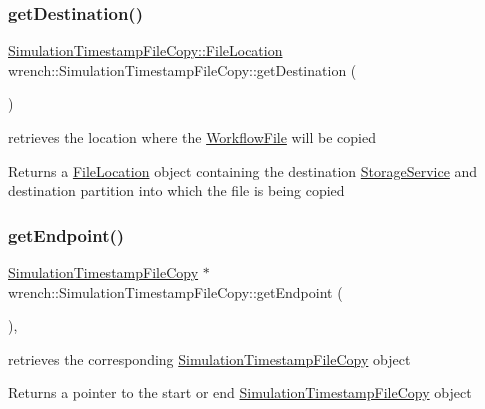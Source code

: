 \subsubsection{\texorpdfstring{get\+Destination()}{getDestination()}}
{\footnotesize\ttfamily \hyperlink{structwrench_1_1_simulation_timestamp_file_copy_1_1_file_location}{Simulation\+Timestamp\+File\+Copy\+::\+File\+Location} wrench\+::\+Simulation\+Timestamp\+File\+Copy\+::get\+Destination (\begin{DoxyParamCaption}{ }\end{DoxyParamCaption})}



retrieves the location where the \hyperlink{classwrench_1_1_workflow_file}{Workflow\+File} will be copied 

\begin{DoxyReturn}{Returns}
a \hyperlink{structwrench_1_1_simulation_timestamp_file_copy_1_1_file_location}{File\+Location} object containing the destination \hyperlink{classwrench_1_1_storage_service}{Storage\+Service} and destination partition into which the file is being copied 
\end{DoxyReturn}
\mbox{\label{classwrench_1_1_simulation_timestamp_file_copy_a2cd940b53a294459ebcab5bce823c9a0}} 
\subsubsection{\texorpdfstring{get\+Endpoint()}{getEndpoint()}}
{\footnotesize\ttfamily \hyperlink{classwrench_1_1_simulation_timestamp_file_copy}{Simulation\+Timestamp\+File\+Copy} $\ast$ wrench\+::\+Simulation\+Timestamp\+File\+Copy\+::get\+Endpoint (\begin{DoxyParamCaption}{ }\end{DoxyParamCaption})\hspace{0.3cm}{\ttfamily [override]}, {\ttfamily [virtual]}}



retrieves the corresponding \hyperlink{classwrench_1_1_simulation_timestamp_file_copy}{Simulation\+Timestamp\+File\+Copy} object 

\begin{DoxyReturn}{Returns}
a pointer to the start or end \hyperlink{classwrench_1_1_simulation_timestamp_file_copy}{Simulation\+Timestamp\+File\+Copy} object 
\end{DoxyReturn}


